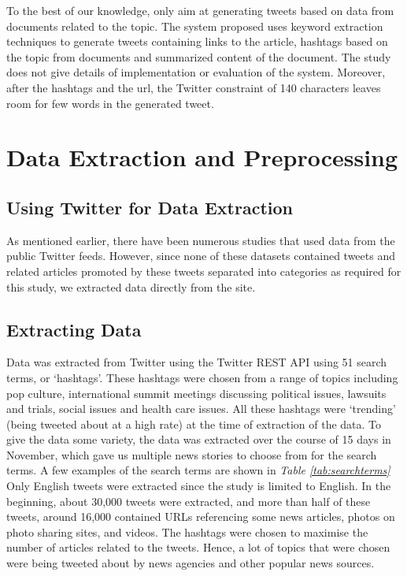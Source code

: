 \documentclass[11pt]{article}
\newcommand{\tabref}[1]{\textit{Table \ref{#1}}}
\begin{document}
To the best of our knowledge, only  aim at generating tweets based on data from documents related to the topic. The system proposed uses keyword extraction techniques to generate tweets containing links to the article, hashtags based on the topic from documents and summarized content of the document. The study does not give details of implementation or evaluation of the system. Moreover, after the hashtags and the url, the Twitter constraint of 140 characters leaves room for few words in the generated tweet.


\section{Data Extraction and Preprocessing}

\subsection{Using Twitter for Data Extraction}

As mentioned earlier, there have been numerous studies that used data from the public Twitter feeds. However, since none of these datasets contained tweets and related articles promoted by these tweets separated into categories as required for this study, we extracted data directly from the site.

\subsection{Extracting Data}

Data was extracted from Twitter using the Twitter REST API using 51 search terms, or ‘hashtags’. These hashtags were chosen from a range of topics including pop culture,  international summit meetings discussing political issues, lawsuits and trials, social issues and health care issues. All these hashtags were ‘trending’ (being tweeted about at a high rate) at the time of extraction of the data. To give the data some variety, the data was extracted over the course of 15 days in November, which gave us multiple news stories to choose from for the search terms. A few examples of the search terms are shown in \tabref{tab:searchterms} Only English tweets were extracted since the study is limited to English. In the beginning, about 30,000 tweets were extracted, and more than half of these tweets, around 16,000 contained URLs referencing some news articles, photos on photo sharing sites, and videos. The hashtags were chosen to maximise the number of articles related to the tweets. Hence, a lot of topics that were chosen were being tweeted about by news agencies and other popular news sources.
\end{document}
